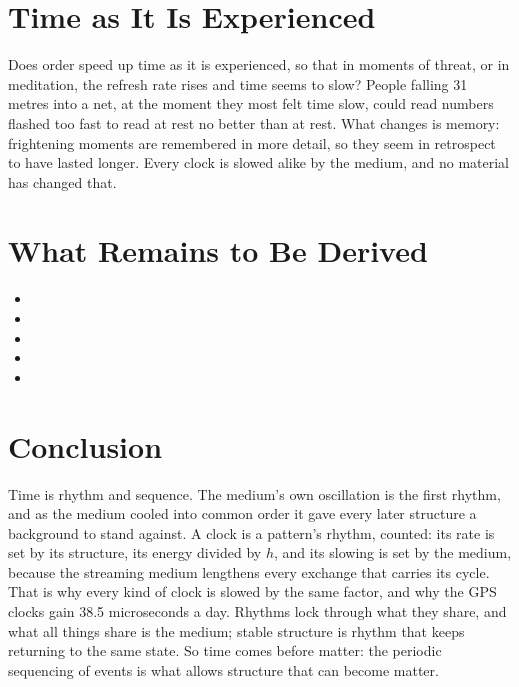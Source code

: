 \documentclass[11pt,a4paper]{article}
\begin{document}
\section{Time as It Is Experienced}
\label{sec:experienced}

Does order speed up time as it is experienced, so that in moments of threat, or in meditation, the refresh rate rises and time seems to slow?  People falling 31 metres into a net, at the moment they most felt time slow, could read numbers flashed too fast to read at rest no better than at rest. What changes is memory: frightening moments are remembered in more detail, so they seem in retrospect to have lasted longer.  Every clock is slowed alike by the medium, and no material has changed that.

\section{What Remains to Be Derived}
\label{sec:owed}

\begin{itemize}
\item {}
\item {}
\item {}
\item {}
\item {}
\end{itemize}

\section*{Conclusion}

Time is rhythm and sequence. The medium's own oscillation is the first rhythm, and as the medium cooled into common order it gave every later structure a background to stand against. A clock is a pattern's rhythm, counted: its rate is set by its structure, its energy divided by $h$, and its slowing is set by the medium, because the streaming medium lengthens every exchange that carries its cycle. That is why every kind of clock is slowed by the same factor, and why the GPS clocks gain 38.5 microseconds a day. Rhythms lock through what they share, and what all things share is the medium; stable structure is rhythm that keeps returning to the same state. So time comes before matter: the periodic sequencing of events is what allows structure that can become matter.
\end{document}
